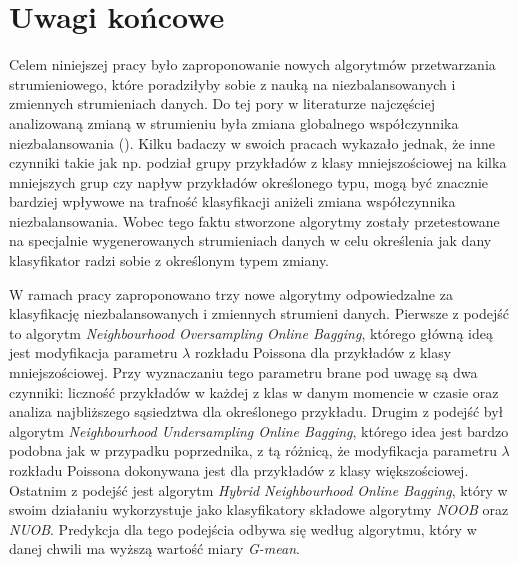 \chapter{Uwagi końcowe}

\noindent Celem niniejszej pracy było zaproponowanie nowych algorytmów przetwarzania strumieniowego, które poradziłyby sobie z nauką na niezbalansowanych i zmiennych strumieniach danych. Do tej pory w literaturze najczęściej analizowaną zmianą w strumieniu była zmiana globalnego współczynnika niezbalansowania (). Kilku badaczy w swoich pracach wykazało jednak, że inne czynniki takie jak np. podział grupy przykładów z klasy mniejszościowej na kilka mniejszych grup czy napływ przykładów określonego typu, mogą być znacznie bardziej wpływowe na trafność klasyfikacji aniżeli zmiana współczynnika niezbalansowania. Wobec tego faktu stworzone algorytmy zostały przetestowane na specjalnie wygenerowanych strumieniach danych w celu określenia jak dany klasyfikator radzi sobie z określonym typem zmiany.

W ramach pracy zaproponowano trzy nowe algorytmy odpowiedzalne za klasyfikację niezbalansowanych i zmiennych strumieni danych. Pierwsze z podejść to algorytm \textit{Neighbourhood Oversampling Online Bagging}, którego główną ideą jest modyfikacja parametru $\lambda$ rozkładu Poissona dla przykładów z klasy mniejszościowej. Przy wyznaczaniu tego parametru brane pod uwagę są dwa czynniki: liczność przykładów w każdej z klas w danym momencie w czasie oraz analiza najbliższego sąsiedztwa dla określonego przykładu. Drugim z podejść był algorytm \textit{Neighbourhood Undersampling Online Bagging}, którego idea jest bardzo podobna jak w przypadku poprzednika, z tą różnicą, że modyfikacja parametru $\lambda$ rozkładu Poissona dokonywana jest dla przykładów z klasy większościowej. Ostatnim z podejść jest algorytm \textit{Hybrid Neighbourhood Online Bagging}, który w swoim działaniu wykorzystuje jako klasyfikatory składowe algorytmy \textit{NOOB} oraz \textit{NUOB}. Predykcja dla tego podejścia odbywa się według algorytmu, który w danej chwili ma wyższą wartość miary \textit{G-mean}.


